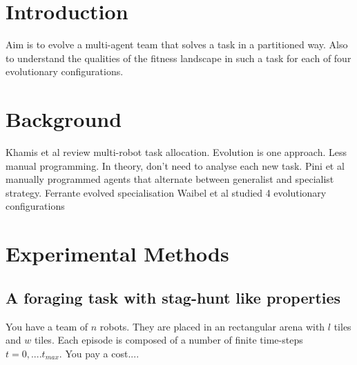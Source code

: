 \documentclass[sigconf]{aamas}  %
\begin{document}

\maketitle



\section{Introduction}

Aim is to evolve a multi-agent team that solves a task in a partitioned way. 
Also to understand the qualities of the fitness landscape in such a task for each of four evolutionary configurations. 

\section{Background}

Khamis et al review multi-robot task allocation. Evolution is one approach. Less manual programming. In theory, don’t need to analyse each new task.
Pini et al manually programmed agents that alternate between generalist and specialist strategy.
Ferrante evolved specialisation 
Waibel et al studied 4 evolutionary configurations

\section{Experimental Methods}

\subsection{A foraging task with stag-hunt like properties}


You have a team of $n$ robots. They are placed in an rectangular arena  with $l$ tiles and $w$ tiles. Each episode is composed of a number of finite time-steps $t=0, .... t_{max}$.
You pay a cost....
\end{document}
